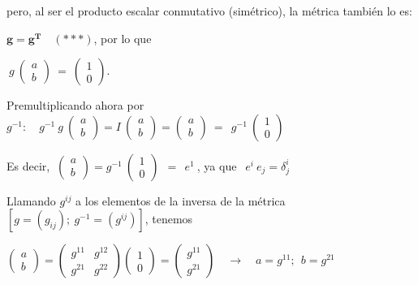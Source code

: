  pero, al ser el producto escalar conmutativo (simétrico), la métrica también lo es: 
 
 $\boldsymbol{g=g^T} \quad (***)$, por lo que  
 
 $\ g\ \left( \begin{matrix} a \\ b \end{matrix} \right) \ = \ \left( \begin{matrix} 1 \\ 0 \end{matrix} \right)$.
 
 Premultiplicando ahora por $g^{-1}:\quad g^{-1} \ g \ \left( \begin{matrix} a \\ b \end{matrix} \right) = I \ \left( \begin{matrix} a \\ b \end{matrix} \right) = \left( \begin{matrix} a \\ b \end{matrix} \right) \ \boldsymbol{=} \ \ g^{-1} \ \left( \begin{matrix} 1 \\ 0 \end{matrix} \right) $
 
 Es decir, $\ \left( \begin{matrix} a \\ b \end{matrix} \right) = g^{-1} \ \left( \begin{matrix} 1 \\ 0 \end{matrix} \right) \ \ \boldsymbol{=} \ \ e^1 \ $, ya que $\ \ e^i\ e_j=\delta^i_j$
 
 Llamando $g^{ij}$ a los elementos de la inversa de la métrica \textcolor{gris}{$\left[ g=(g_{ij});\ g^{-1}=(g^{ij}) \right]$}, tenemos
 
 $\left( \begin{matrix} a \\ b \end{matrix} \right)=
 \left( \begin{matrix} g^{11}&g^{12} \\ g^{21}&g^{22} \end{matrix} \right)
 \left( \begin{matrix} 1 \\ 0 \end{matrix} \right)
 =\left( \begin{matrix} g^{11} \\ g^{21} \end{matrix} \right)
 \quad \to \quad a=g^{11};\ \ b=g^{21}$
 
